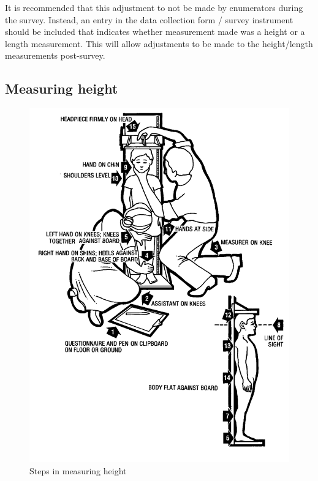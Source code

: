 \documentclass[
  12pt,
]{book}
\begin{document}
It is recommended that this adjustment to not be made by enumerators during the survey. Instead, an entry in the data collection form / survey instrument should be included that indicates whether measurement made was a height or a length measurement. This will allow adjustments to be made to the height/length measurements post-survey.

\hypertarget{measuring-height}{%
\subsection{Measuring height}\label{measuring-height}}

\begin{figure}

{\centering \includegraphics[width=12.49in]{images/height} 

}

\caption{Steps in measuring height}\label{fig:height06}
\end{figure}
\end{document}
